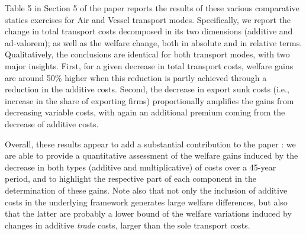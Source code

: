 \documentclass[a4paper,11pt]{article}
\begin{document}
Table 5 in Section 5 of the paper reports the results of these various comparative statics exercises for Air and Vessel transport modes. Specifically, we report the change in total transport costs decomposed in its two dimensions (additive and ad-valorem); as well as the welfare change, both in absolute and in relative terms. Qualitatively, the conclusions are identical for both transport modes, with two major insights. First, for a given decrease in total transport costs,  welfare gains are around 50\% higher when this reduction is partly achieved through a reduction in the additive costs. Second, the decrease in export sunk costs (i.e., increase in the share of exporting firms) proportionally amplifies the gains from decreasing variable costs, with again an additional premium coming from the decrease of additive costs.

Overall, these results appear to add a substantial contribution to the paper : we are able to provide a quantitative assessment of the welfare gains induced by the decrease in both types (additive and multiplicative) of costs over a 45-year period, and to highlight the respective part of each component in the determination of these gains. Note also that not only the inclusion of additive costs in the underlying framework generates large welfare differences, but also that the latter are probably a lower bound of the welfare variations induced by changes in additive \emph{trade} costs, larger than the sole transport costs.







\end{document}
